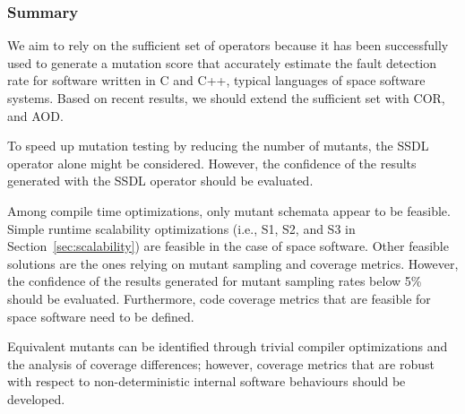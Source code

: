 \subsubsection{Summary}

We aim to rely on the sufficient set of operators because it has been successfully used to generate a mutation score that accurately estimate the fault detection rate for software written in C and C++, typical languages of space software systems.
Based on recent results, we should extend the sufficient set with COR, and AOD.

To speed up mutation testing by reducing the number of mutants, the SSDL operator alone might be considered. However, the confidence of the results generated with the SSDL operator should be evaluated.

Among compile time optimizations, only mutant schemata appear to be feasible.
Simple runtime scalability optimizations (i.e., S1, S2, and S3 in Section~\ref{sec:scalability}) are feasible in the case of space software. Other feasible solutions are the ones relying on mutant sampling and coverage metrics. However, the confidence of the results generated for mutant sampling rates below 5\% should be evaluated. Furthermore, code coverage metrics that are feasible for space software need to be defined.

Equivalent mutants can be identified through trivial compiler optimizations and the analysis of coverage differences; however, coverage metrics that are robust with respect to non-deterministic internal software behaviours should be developed. 

